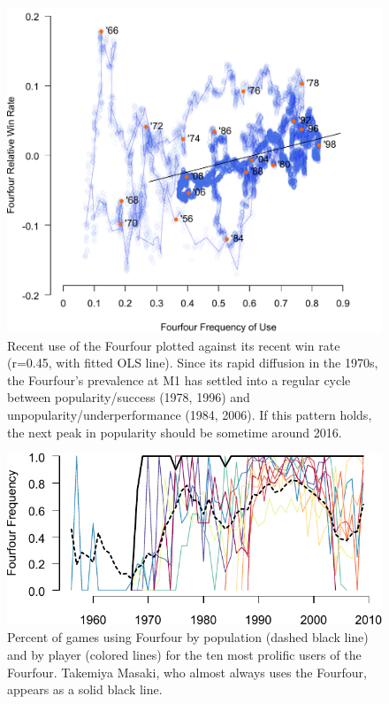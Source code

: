 \begin{figure}[t]
\begin{center} 
\includegraphics[scale=0.75]{figures/gofirstmove/figSuccessCycle.pdf}
\caption{Recent use of the Fourfour plotted against its recent win rate (r=0.45, with fitted OLS line).  Since its rapid diffusion in the 1970s, the Fourfour's prevalence at M1 has settled into a regular cycle between popularity/success (1978, 1996) and unpopularity/underperformance (1984, 2006).  If this pattern holds, the next peak in popularity should be sometime around 2016.}
\label{fig:SuccessCycle}
\end{center}
\end{figure}

\begin{figure}[t]
\begin{center} 
\includegraphics[scale=1.0]{figures/gofirstmove/figPersonalFourfour.pdf}
\caption{Percent of games using Fourfour by population (dashed black line) and by player (colored lines) for the ten most prolific users of the Fourfour.  Takemiya Masaki, who almost always uses the Fourfour, appears as a solid black line.}
\label{fig:PersonalFourfour}
\end{center}
\end{figure}
 
